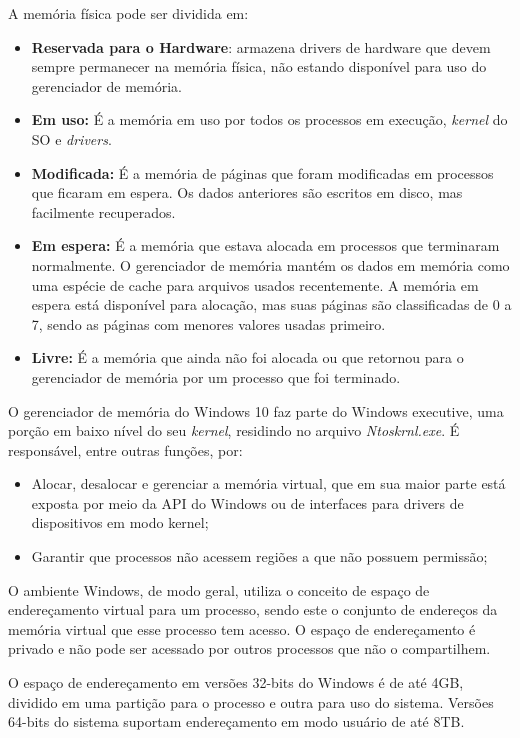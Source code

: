 \documentclass[journal]{IEEEtran}
\begin{document}
	A memória física pode ser dividida em:
	\begin{itemize}
		\item \textbf{Reservada para o Hardware}: armazena drivers de hardware que devem sempre permanecer na memória física, não estando disponível para uso do gerenciador de memória.
		
		\item \textbf{Em uso:} É a memória em uso por todos os processos em execução, \emph{kernel} do SO e \emph{drivers}.
		
		\item \textbf{Modificada:} É a memória de páginas que foram modificadas em processos que ficaram em espera. Os dados anteriores são escritos em disco, mas facilmente recuperados.
			
		\item \textbf{Em espera:} É a memória que estava alocada em processos que terminaram normalmente. O gerenciador de memória mantém os dados em memória como uma espécie de cache para arquivos usados recentemente. A memória em espera está disponível para alocação, mas suas páginas são classificadas de 0 a 7, sendo as páginas com menores valores usadas primeiro.
		
		\item \textbf{Livre:} É a memória que ainda não foi alocada ou que retornou para o gerenciador de memória por um processo que foi terminado.
	\end{itemize}

	O gerenciador de memória do Windows 10 faz parte do Windows executive, uma porção em baixo nível do seu \emph{kernel}, residindo no arquivo \emph{Ntoskrnl.exe}. É responsável, entre outras funções, por:
	\begin{itemize}	
		\item Alocar, desalocar e gerenciar a memória virtual, que em sua maior parte está exposta por meio da API do Windows ou de interfaces para drivers de dispositivos em modo kernel;
		\item Garantir que processos não acessem regiões a que não possuem permissão;
	\end{itemize}
	
	O ambiente Windows, de modo geral, utiliza o conceito de espaço de endereçamento virtual para um processo, sendo este o conjunto de endereços da memória virtual que esse processo tem acesso. O espaço de endereçamento é privado e não pode ser acessado por outros processos que não o compartilhem.
	
	O espaço de endereçamento em versões 32-bits do Windows é de até 4GB, dividido em uma partição para o processo e outra para uso do sistema. Versões 64-bits do sistema suportam endereçamento em modo usuário de até 8TB.
	
\end{document}
